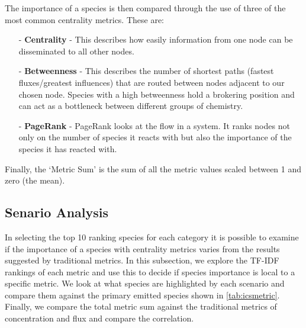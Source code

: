 The importance of a species is then compared through the use of three of the most common centrality metrics. These are:


\begin{itemize}
\item[-] \textbf{Centrality} - This describes how easily information from one node can be disseminated to all other nodes. 
\item[-] \textbf{Betweenness} - This describes the number of shortest paths (fastest fluxes/greatest influences) that are routed between nodes adjacent to our chosen node. Species with a high betweenness hold a brokering position and can act as a bottleneck between different groups of chemistry. 
\item[-] \textbf{PageRank} - PageRank looks at the flow in a system. It ranks nodes not only on the number of species it reacts with but also the importance of the species it has reacted with.

\end{itemize}

Finally, the `Metric Sum' is the sum of all the metric values scaled between 1 and zero (the mean).

\subsection{Senario Analysis}
In selecting the top 10 ranking species for each category it is possible to examine if the importance of a species with centrality metrics varies from the results suggested by traditional metrics. In this subsection, we explore the TF-IDF rankings of each metric and use this to decide if species importance is local to a specific metric. We look at what species are highlighted by each scenario and compare them against the primary emitted species shown in \autoref{tab:icsmetric}. Finally, we compare the total metric sum against the traditional metrics of concentration and flux and compare the correlation. 

